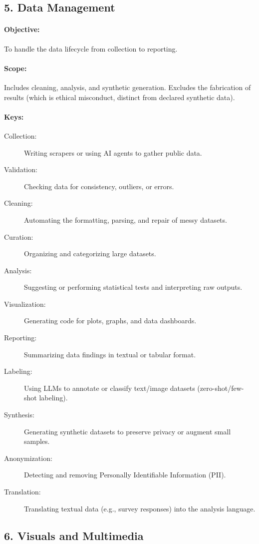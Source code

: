 \subsection*{5. Data Management}
\paragraph{Objective:} To handle the data lifecycle from collection to reporting.
\paragraph{Scope:} Includes cleaning, analysis, and synthetic generation.
Excludes the fabrication of results (which is ethical misconduct, distinct from declared synthetic data).
\paragraph{Keys:}
\begin{description}
    \item[Collection:] Writing scrapers or using \gls{AI} agents to gather public data.
    \item[Validation:] Checking data for consistency, outliers, or errors.
    \item[Cleaning:] Automating the formatting, parsing, and repair of messy datasets.
    \item[Curation:] Organizing and categorizing large datasets.
    \item[Analysis:] Suggesting or performing statistical tests and interpreting raw outputs.
    \item[Visualization:] Generating code for plots, graphs, and data dashboards.
    \item[Reporting:] Summarizing data findings in textual or tabular format.
    \item[Labeling:] Using LLMs to annotate or classify text/image datasets (zero-shot/few-shot labeling).
    \item[Synthesis:] Generating synthetic datasets to preserve privacy or augment small samples.
    \item[Anonymization:] Detecting and removing Personally Identifiable Information (PII).
    \item[Translation:] Translating textual data (e.g., survey responses) into the analysis language.
\end{description}

\subsection*{6. Visuals and Multimedia}
